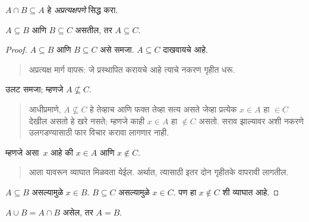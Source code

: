 \begin{prob}
$A \cap B \subseteq A$ हे \emph{अप्रत्यक्षपणे} सिद्ध करा.
\end{prob}

\begin{prop}
$A \subseteq B$ आणि $B \subseteq C$ असतील, तर $A \subseteq C$.
\end{prop}

\begin{proof}
$A \subseteq B$ आणि $B \subseteq C$ असे समजा. $A \subseteq C$ दाखवायचे आहे.
\begin{quote}
अप्रत्यक्ष मार्ग वापरू: जे प्रस्थापित करायचे आहे त्याचे नकरण गृहीत धरू.
\end{quote}
उलट समजा; म्हणजे $A \nsubseteq C$.
\begin{quote}
आधीप्रमाणे, $A \nsubseteq C$ हे तेव्हाच आणि फक्त तेव्हा सत्य असते जेव्हा प्रत्येक $x \in A$ हा $\in C$ देखील असतो हे खरे नसते; म्हणजे काही $x \in A$ हा $\notin C$ असतो. सराव झाल्यावर अशी नकरणे उलगडण्यासाठी फार विचार करावा लागणार नाही.
\end{quote}
म्हणजे असा~$x$ आहे की $x \in A$ आणि $x \notin C$.
\begin{quote}
आता यावरून व्याघात मिळवता येईल. अर्थात, त्यासाठी इतर दोन गृहीतके वापरावी लागतील.
\end{quote}
$A \subseteq B$ असल्यामुळे $x \in B$. $B \subseteq C$ असल्यामुळे $x \in C$. पण हा $x \notin C$ शी व्याघात आहे.
\end{proof}

\begin{prop}
$A \cup B = A \cap B$ असेल, तर $A = B$.
\end{prop}

